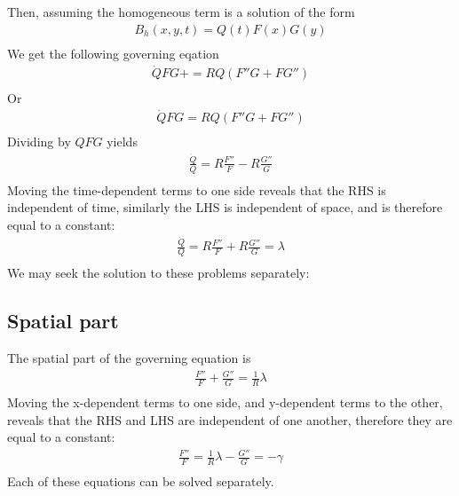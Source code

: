 \documentclass[11pt]{article}
\begin{document}
Then, assuming the homogeneous term is a solution of the form
\begin{equation}\begin{aligned}
B_h(x,y,t) = Q(t) F(x) G(y) \\
\end{aligned} \end{equation}
We get the following governing eqation
\begin{equation}\begin{aligned}
\dot{Q} FG + = R Q( F'' G +  F G'') \\
\end{aligned} \end{equation}
Or
\begin{equation}\begin{aligned}
\dot{Q} FG = R Q( F'' G +  F G'') \\
\end{aligned} \end{equation}
Dividing by $QFG$ yields
\begin{equation}\begin{aligned}
\frac{\dot{Q}}{Q} = R \frac{F''}{F} - R \frac{G''}{G} \\
\end{aligned} \end{equation}
Moving the time-dependent terms to one side reveals that the RHS is independent of time, similarly the LHS is independent of space, and is therefore equal to a constant:
\begin{equation}\begin{aligned}
\frac{\dot{Q}}{Q} = R \frac{F''}{F} + R \frac{G''}{G} = \lambda \\
\end{aligned} \end{equation}
We may seek the solution to these problems separately:

\subsection{Spatial part}
The spatial part of the governing equation is
\begin{equation}\begin{aligned}
 \frac{F''}{F} + \frac{G''}{G} = \frac{1}{R} \lambda \\
\end{aligned} \end{equation}
Moving the x-dependent terms to one side, and y-dependent terms to the other, reveals that the RHS and LHS are independent of one another, therefore they are equal to a constant:
\begin{equation}\begin{aligned}
 \frac{F''}{F} = \frac{1}{R} \lambda - \frac{G''}{G} = - \gamma \\
\end{aligned} \end{equation}
Each of these equations can be solved separately.
\end{document}
